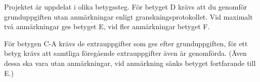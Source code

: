Projektet är uppdelat i olika betygssteg.
För betyget D krävs att du genomför grunduppgiften utan anmärkningar 
enligt granskningsprotokollet.
Vid maximalt två anmärkningar ges betyget E, vid fler anmärkningar betyget F.

För betygen C-A krävs de extrauppgifter som ges efter grunduppgiften, för ett 
betyg krävs att samtliga föregående extrauppgifter även är genomförda.
(Även dessa ska vara utan anmärkningar, vid anmärkning sänks betyget 
fortfarande till E.)
